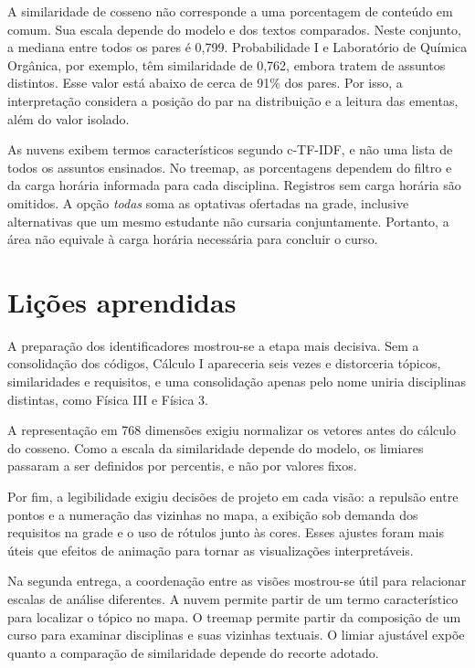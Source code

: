 \documentclass[
  12pt,
  oneside,
  a4paper,
  article,
  brazil
]{USPSC-classe/USPSC}
\begin{document}
A similaridade de cosseno não corresponde a uma porcentagem de conteúdo em
comum. Sua escala depende do modelo e dos textos comparados. Neste conjunto, a
mediana entre todos os pares é 0,799. Probabilidade I e Laboratório de Química
Orgânica, por exemplo, têm similaridade de 0,762, embora tratem de assuntos
distintos. Esse valor está abaixo de cerca de 91\% dos pares. Por isso, a
interpretação considera a posição do par na distribuição e a leitura das
ementas, além do valor isolado.

As nuvens exibem termos característicos segundo c-TF-IDF, e não uma lista de
todos os assuntos ensinados. No treemap, as porcentagens dependem do filtro e
da carga horária informada para cada disciplina. Registros sem carga horária
são omitidos. A opção \emph{todas} soma as optativas ofertadas na grade,
inclusive alternativas que um mesmo estudante não cursaria conjuntamente.
Portanto, a área não equivale à carga horária necessária para concluir o curso.

\section{Lições aprendidas}

A preparação dos identificadores mostrou-se a etapa mais decisiva. Sem a
consolidação dos códigos, Cálculo I apareceria seis vezes e distorceria tópicos,
similaridades e requisitos, e uma consolidação apenas pelo nome uniria
disciplinas distintas, como Física III e Física 3.

A representação em 768 dimensões exigiu normalizar os vetores antes do cálculo
do cosseno. Como a escala da similaridade depende do modelo, os limiares
passaram a ser definidos por percentis, e não por valores fixos.

Por fim, a legibilidade exigiu decisões de projeto em cada visão: a repulsão
entre pontos e a numeração das vizinhas no mapa, a exibição sob demanda dos
requisitos na grade e o uso de rótulos junto às cores. Esses ajustes foram mais
úteis que efeitos de animação para tornar as visualizações interpretáveis.

Na segunda entrega, a coordenação entre as visões mostrou-se útil para
relacionar escalas de análise diferentes. A nuvem permite partir de um termo
característico para localizar o tópico no mapa. O treemap permite partir da
composição de um curso para examinar disciplinas e suas vizinhas textuais. O
limiar ajustável expõe quanto a comparação de similaridade depende do recorte
adotado.
\end{document}
